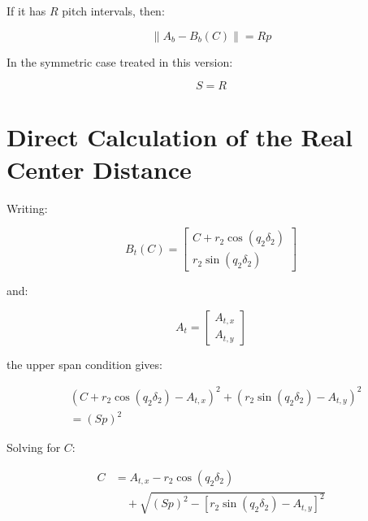 \documentclass[12pt,a4paper]{article}
\begin{document}
If it has $R$ pitch intervals, then:

\begin{equation}
\left\lVert A_b-B_b(C) \right\rVert = Rp
\label{eq:lower_run}
\end{equation}

In the symmetric case treated in this version:

\begin{equation}
S=R
\end{equation}

\section{Direct Calculation of the Real Center Distance}

Writing:

\begin{equation}
B_t(C)=
\begin{bmatrix}
C+r_2\cos(q_2\delta_2)\\
r_2\sin(q_2\delta_2)
\end{bmatrix}
\end{equation}

and:

\begin{equation}
A_t=
\begin{bmatrix}
A_{t,x}\\
A_{t,y}
\end{bmatrix}
\end{equation}

the upper span condition gives:

\begin{equation}
\begin{aligned}
&
\left(C+r_2\cos(q_2\delta_2)-A_{t,x}\right)^2
+
\left(r_2\sin(q_2\delta_2)-A_{t,y}\right)^2
\\
&=
(Sp)^2
\end{aligned}
\end{equation}

Solving for $C$:

\begin{equation}
\begin{aligned}
C
&=
A_{t,x}
-
r_2\cos(q_2\delta_2)
\\
&\quad+
\sqrt{
(Sp)^2
-
\left[
r_2\sin(q_2\delta_2)-A_{t,y}
\right]^2
}
\end{aligned}
\label{eq:direct_center_distance}
\end{equation}
\end{document}
